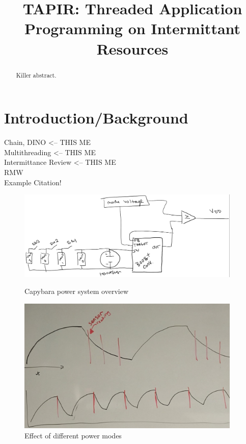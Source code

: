 \documentclass[11pt]{sensys-proc}
\title{TAPIR: Threaded Application Programming on Intermittant Resources}
\begin{document}
\maketitle

\begin{abstract}
Killer abstract.
\end{abstract}

\section{Introduction/Background}
  \label{sec:intro}
  Chain, DINO <-- THIS ME\\
  Multithreading <-- THIS ME\\
  Intermittance Review <-- THIS ME\\
  RMW\\
  Example Citation\cite{RC,Grace}!


\begin{figure}
\centering
\begin{minipage}[b]{0.49\textwidth}
  \includegraphics[width=0.95\textwidth,center]{capybara-all.png}
\caption{Capybara power system overview}\label{label-a}
\end{minipage}\hfill
\begin{minipage}[b]{0.49\textwidth}
  \includegraphics[width=0.95\textwidth,center]{power_modes.pdf}
\caption{Effect of different power modes}\label{label-b}
\end{minipage}
\end{figure}
\end{document}
